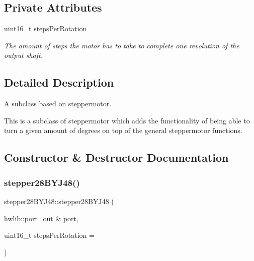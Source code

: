 \subsection*{Private Attributes}
\begin{DoxyCompactItemize}
\item 
\mbox{\label{classstepper28BYJ48_a1e6ced57ccc8b4df2f706ed25179586a}} 
uint16\+\_\+t \hyperlink{classstepper28BYJ48_a1e6ced57ccc8b4df2f706ed25179586a}{steps\+Per\+Rotation}
\begin{DoxyCompactList}\small\item\em The amount of steps the motor has to take to complete one revolution of the output shaft. \end{DoxyCompactList}\end{DoxyCompactItemize}


\subsection{Detailed Description}
A subclass based on steppermotor. 

This is a subclass of steppermotor which adds the functionality of being able to turn a given amount of degrees on top of the general steppermotor functions. 

\subsection{Constructor \& Destructor Documentation}
\mbox{\label{classstepper28BYJ48_a0cd7320252c267c728f17ca3de814019}} 
\subsubsection{\texorpdfstring{stepper28\+B\+Y\+J48()}{stepper28BYJ48()}}
{\footnotesize\ttfamily stepper28\+B\+Y\+J48\+::stepper28\+B\+Y\+J48 (\begin{DoxyParamCaption}\item[{hwlib\+::port\+\_\+out \&}]{port,  }\item[{uint16\+\_\+t}]{steps\+Per\+Rotation = {} }\end{DoxyParamCaption})}



